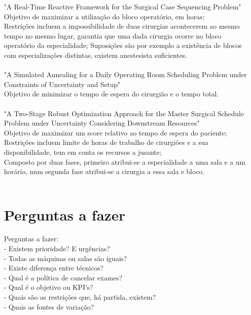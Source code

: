 "A Real-Time Reactive Framework for the Surgical Case Sequencing Problem"\\ %
Objetivo de maximizar a utilização do bloco operatório, em horas;\\
Restrições incluem a impossibilidade de duas cirurgias acontecerem ao mesmo tempo no mesmo lugar, garantia que uma dada cirurgia ocorre no bloco operatório da especialidade;
Suposições são por exemplo a existência de blocos com especializações distintas, existem anestesista suficientes.\\\\

"A Simulated Annealing for a Daily Operating Room Scheduling Problem under Constraints of Uncertainty and Setup"\\ %
Objetivo de minimizar o tempo de espera do cirurgião e o tempo total.\\\\

"A Two-Stage Robust Optimization Approach for the Master Surgical Schedule Problem under Uncertainty Considering Downstream Resources"\\ %
Objetivo de maximizar um score relativo ao tempo de espera do paciente;\\
Restrições incluem limite de horas de trabalho de cirurgiões e a sua disponibilidade, tem em conta os recursos a jusante;\\
Composto por duas fases, primeiro atribui-se a especialidade a uma sala e a um horário, num segunda fase atribui-se a cirurgia a essa sala e bloco.\\\\


\section{Perguntas a fazer}
\label{sec:perg}

Perguntas a fazer:\\
- Existem prioridade? E urgências?\\
- Todas as máquinas ou salas são iguais?\\
- Existe diferença entre técnicos?\\
- Qual é a política de cancelar exames?\\
- Qual é o objetivo ou KPI's?\\
- Quais são as restrições que, há partida, existem?\\
- Quais as fontes de variação?\\

